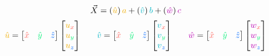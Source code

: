 \documentclass[preview]{standalone}
\begin{document}
$$\vec{X} = \left(\textcolor[HTML]{efac00}{\hat{u}}\right)\textcolor[HTML]{efac00}{a} + \left(\textcolor[HTML]{00b4c4}{\hat{v}}\right)\textcolor[HTML]{00b4c4}{b} + \left(\textcolor[HTML]{ba00b2}{\hat{w}}\right)\textcolor[HTML]{ba00b2}{c}$$
$$\begin{align*}
\textcolor[HTML]{efac00}{\hat{u}} = \begin{bmatrix}\textcolor[HTML]{fe5e56}{\hat{x}}&\textcolor[HTML]{00ef75}{\hat{y}}&\textcolor[HTML]{0069fe}{\hat{z}}\end{bmatrix}\begin{bmatrix}\textcolor[HTML]{efac00}{u}_{\textcolor[HTML]{fe5e56}{x}}\\\textcolor[HTML]{efac00}{u}_{\textcolor[HTML]{00ef75}{y}}\\\textcolor[HTML]{efac00}{u}_{\textcolor[HTML]{0069fe}{z}}\end{bmatrix}
&\quad&
\textcolor[HTML]{00b4c4}{\hat{v}} = \begin{bmatrix}\textcolor[HTML]{fe5e56}{\hat{x}}&\textcolor[HTML]{00ef75}{\hat{y}}&\textcolor[HTML]{0069fe}{\hat{z}}\end{bmatrix}\begin{bmatrix}\textcolor[HTML]{00b4c4}{v}_{\textcolor[HTML]{fe5e56}{x}}\\\textcolor[HTML]{00b4c4}{v}_{\textcolor[HTML]{00ef75}{y}}\\\textcolor[HTML]{00b4c4}{v}_{\textcolor[HTML]{0069fe}{z}}\end{bmatrix}
&\quad&
\textcolor[HTML]{ba00b2}{\hat{w}} = \begin{bmatrix}\textcolor[HTML]{fe5e56}{\hat{x}}&\textcolor[HTML]{00ef75}{\hat{y}}&\textcolor[HTML]{0069fe}{\hat{z}}\end{bmatrix}\begin{bmatrix}\textcolor[HTML]{ba00b2}{w}_{\textcolor[HTML]{fe5e56}{x}}\\\textcolor[HTML]{ba00b2}{w}_{\textcolor[HTML]{00ef75}{y}}\\\textcolor[HTML]{ba00b2}{w}_{\textcolor[HTML]{0069fe}{z}}\end{bmatrix}
\end{align*}$$
\end{document}
